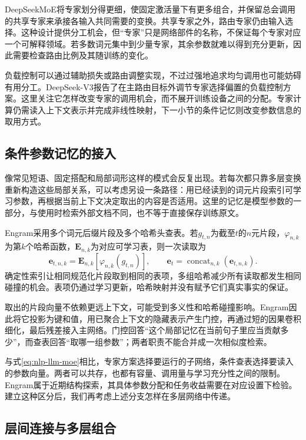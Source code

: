 DeepSeekMoE将专家划分得更细，使固定激活量下有更多组合，并保留总会调用的共享专家来承接各输入共同需要的变换。共享专家之外，路由专家仍由输入选择。这种设计提供分工机会，但“专家”只是网络部件的名称，不保证每个专家对应一个可解释领域。若多数词元集中到少量专家，其余参数就难以得到充分更新，因此需要检查路由比例及其随训练的变化。

负载控制可以通过辅助损失或路由调整实现，不过过强地追求均匀调用也可能妨碍有用分工。DeepSeek-V3报告了在主路由目标外调节专家选择偏置的负载控制方案。这里关注它怎样改变专家的调用机会，而不展开训练设备之间的分配。专家计算仍需读入上下文表示并完成非线性映射，下一小节的条件记忆则改变参数信息的取用方式。

\subsection{条件参数记忆的接入}
\label{sec:nlp-llm-conditional-memory}

像常见短语、固定搭配和局部词形这样的模式会反复出现。若每次都只靠多层变换重新构造这些局部关系，可以考虑另设一条路径：用已经读到的词元片段索引可学习参数，再根据当前上下文决定取出的内容是否适用。这里的记忆是模型参数的一部分，与使用时检索外部文档不同，也不等于直接保存训练原文。

Engram采用多个词元后缀片段及多个哈希头查表。若$g_{t,n}$为截至$t$的$n$元片段，$\varphi_{n,k}$为第$k$个哈希函数，$\bm E_{n,k}$为对应可学习表，则一次读取为
\begin{equation}
 \bm e_{t,n,k}=\bm E_{n,k}[\varphi_{n,k}(g_{t,n})],
 \qquad
 \bm e_t=\operatorname{concat}_{n,k}(\bm e_{t,n,k}).
 \label{eq:nlp-llm-engram}
\end{equation}
确定性索引让相同规范化片段取到相同的表项，多组哈希减少所有读取都发生相同碰撞的机会。表项仍通过学习更新，哈希映射并没有赋予它们真实事实的保证。

取出的片段向量不依赖更远上下文，可能受到多义性和哈希碰撞影响。Engram因此将它投影为键和值，用已聚合上下文的隐藏表示产生门控，再通过短的因果卷积细化，最后残差接入主网络。门控回答“这个局部记忆在当前句子里应当贡献多少”，而查表回答“取哪一组参数”；两者职责不能合并成一次相似度检索。

与式\eqref{eq:nlp-llm-moe}相比，专家方案选择要运行的子网络，条件查表选择要读入的参数向量。两者可以共存，也都有容量、调用量与学习充分性之间的限制。Engram属于近期结构探索，其具体参数分配和任务收益需要在对应设置下检验。建立这种区分后，我们再考虑上述分支怎样在多层网络中传递。

\subsection{层间连接与多层组合}
\label{sec:nlp-llm-layer-composition}

